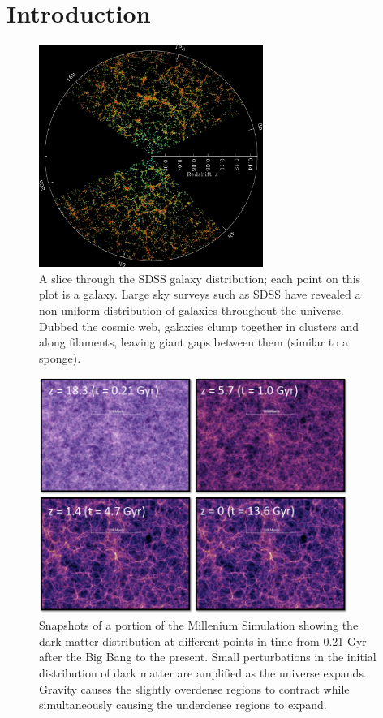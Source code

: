 \chapter{Introduction}



\begin{figure}
    \includegraphics[width=0.65\textwidth]{Images/Intro/sdss}
    \caption[SDSS galaxy map]{A slice through the SDSS galaxy distribution; each 
    point on this plot is a galaxy.  Large sky surveys such as SDSS have 
    revealed a non-uniform distribution of galaxies throughout the universe.  
    Dubbed the cosmic web, galaxies clump together in clusters and along 
    filaments, leaving giant gaps between them (similar to a sponge).}
    \label{fig:SDSS_map}
\end{figure}

\begin{figure}
    \includegraphics[width=0.9\textwidth]{Images/Intro/Millenium_simulation}
    \caption[Dark matter simulation]{Snapshots of a portion of the Millenium 
    Simulation showing the dark matter distribution at different points in time 
    from 0.21 Gyr after the Big Bang to the present.  Small perturbations in the 
    initial distribution of dark matter are amplified as the universe expands.  
    Gravity causes the slightly overdense regions to contract while 
    simultaneously causing the underdense regions to expand.}
    \label{fig:DMsim}
\end{figure}

